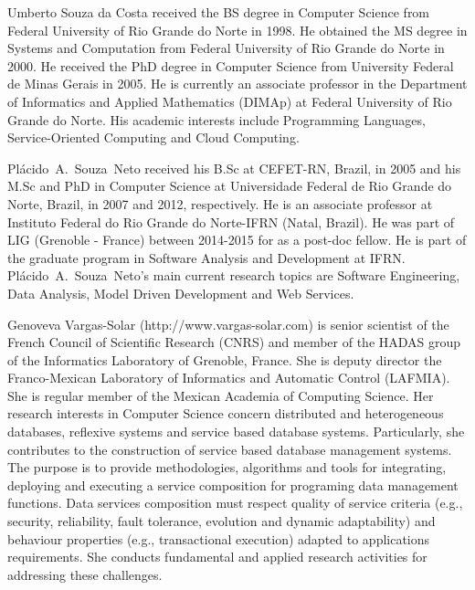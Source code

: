\documentclass{singlecol-new}
\theoremstyle{TH}{
\newtheorem{lemma}{Lemma}
\newtheorem{theorem}[lemma]{Theorem}
\newtheorem{corrolary}[lemma]{Corrolary}
\newtheorem{conjecture}[lemma]{Conjecture}
\newtheorem{proposition}[lemma]{Proposition}
\newtheorem{claim}[lemma]{Claim}
\newtheorem{stheorem}[lemma]{Wrong Theorem}
\newtheorem{algorithm}{Algorithm}
}
\theoremstyle{THrm}{
\newtheorem{definition}{Definition}[section]
\newtheorem{question}{Question}[section]
\newtheorem{remark}{Remark}
\newtheorem{scheme}{Scheme}
}
\theoremstyle{THhit}{
\newtheorem{case}{Case}[section]
}
\theoremstyle{THhsl}{
\newtheorem{example}{Example}
}
\begin{document}
\begin{bio}
\noindent Umberto Souza da Costa received the BS degree in Computer Science from Federal University of Rio Grande do Norte in 1998. He obtained the MS degree in Systems and Computation from Federal University of Rio Grande do Norte in 2000. He received the PhD degree in Computer Science from University Federal de Minas Gerais in 2005. He is currently an associate professor in the Department of Informatics and Applied Mathematics (DIMAp) at Federal University of Rio Grande do Norte. His academic interests include Programming Languages, Service-Oriented Computing and Cloud Computing.

\noindent Pl\'acido~A.~Souza~Neto received his B.Sc at CEFET-RN, Brazil, in 2005 and his M.Sc and PhD in Computer Science at Universidade Federal de Rio Grande do Norte, Brazil, in 2007 and 2012, respectively. He is an associate professor at Instituto Federal do Rio Grande do Norte-IFRN (Natal, Brazil). He was part of LIG (Grenoble - France) between 2014-2015 for as a post-doc fellow. He is part of the graduate program in Software Analysis and Development at IFRN. Pl\'acido~A.~Souza~Neto's main current research topics are Software Engineering, Data Analysis, Model Driven Development and Web Services.

\noindent Genoveva Vargas-Solar (http://www.vargas-solar.com) is senior scientist of the French Council of Scientific Research (CNRS) and member of the HADAS group of the Informatics Laboratory of Grenoble, France. She is deputy director the Franco-Mexican Laboratory of Informatics and Automatic Control (LAFMIA). She is regular member of the Mexican Academia of Computing Science. Her research interests in Computer Science concern distributed and heterogeneous databases, reflexive systems and service based database systems. Particularly, she contributes to the construction of service based database management systems. The purpose is to provide methodologies, algorithms and tools for integrating, deploying and executing a service composition for programing data management functions. Data services composition must respect quality of service criteria (e.g., security, reliability, fault tolerance, evolution and dynamic adaptability) and behaviour properties (e.g., transactional execution) adapted to applications requirements. She conducts fundamental and applied research activities for addressing these challenges.


\end{bio}
\end{document}
